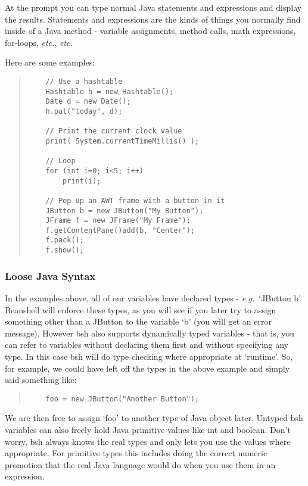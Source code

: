\documentclass[twoside,11pt]{article}
\renewcommand{\_}{\texttt{\symbol{95}}}
\newcommand{\eg}{\textit{e.g.}}
\newcommand{\etc}{\textit{etc.}}
\begin{document}
At the prompt you can type normal Java statements and expressions and
display the results.
Statements and expressions are the kinds of things you normally find
inside of a Java method - variable assignments, method calls, math
expressions, for-loops, \etc, \etc

Here are some examples:
\begin{quote}
\begin{verbatim}
    // Use a hashtable
    Hashtable h = new Hashtable();
    Date d = new Date();
    h.put("today", d);

    // Print the current clock value
    print( System.currentTimeMillis() );

    // Loop
    for (int i=0; i<5; i++)
        print(i);

    // Pop up an AWT frame with a button in it
    JButton b = new JButton("My Button");
    JFrame f = new JFrame("My Frame");
    f.getContentPane()add(b, "Center");
    f.pack();
    f.show();
\end{verbatim}
\end{quote}

\subsubsection{Loose Java Syntax}

In the examples above, all of our variables have declared types - 
\eg\ `JButton b'.  Beanshell will enforce these types, as you will see if
you later try to assign something other than a JButton to the variable
`b' (you will get an error message).  However bsh also supports
dynamically typed variables - that is, you can refer to variables
without declaring them first and without specifying any type.  In this
case bsh will do type checking where appropriate at `runtime'.  So,
for example, we could have left off the types in the above example and
simply said something like:
\begin{quote}
\begin{verbatim}
    foo = new JButton("Another Button");
\end{verbatim}
\end{quote}

We are then free to assign `foo' to another type of Java object later.
Untyped bsh variables can also freely hold Java primitive values like int
and boolean.  Don't worry, bsh always knows the real types and only lets you
use the values where appropriate.  For primitive types this includes doing the
correct numeric promotion that the real Java language would do when you use
them in an expression.
\end{document}
